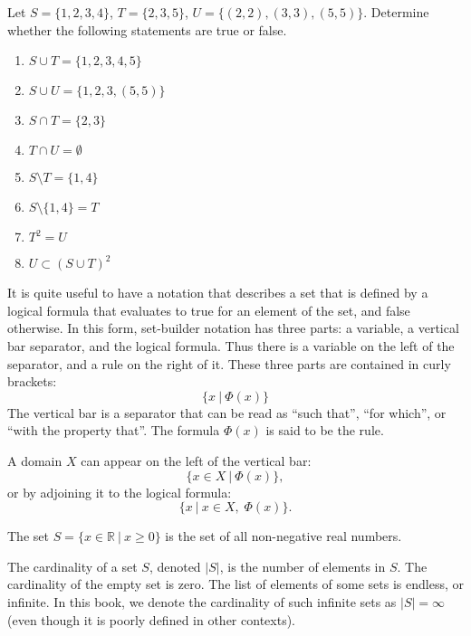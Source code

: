 \begin{exercise}
    Let $S = \{1, 2, 3, 4\}$, $T = \{2, 3, 5\}$, $U = \{(2, 2), (3, 3), (5, 5)\}$. Determine whether the following statements are true or false.
    \begin{multicols}{2}
        \begin{enumerate}[label=(\alph*)]
            \item $S \cup T = \{1, 2, 3, 4, 5\}$
            \item $S \cup U = \{1, 2, 3, (5, 5)\}$
            \item $S \cap T = \{2, 3\}$
            \item $T \cap U = \emptyset$
            \item $S \setminus T = \{1, 4\}$
            \item $S \setminus \{1, 4\} = T$
            \item $T^2 = U$
            \item $U \subset (S \cup T)^2$
        \end{enumerate}
    \end{multicols}
\end{exercise}
It is quite useful to have a notation that describes a set that is defined by a logical formula that evaluates to true for an element of the set, and false otherwise. In this form, set-builder notation has three parts: a variable, a vertical bar separator, and the logical formula. Thus there is a variable on the left of the separator, and a rule on the right of it. These three parts are contained in curly brackets:
\[
    \{x \ | \ \Phi(x)\}
\]
The vertical bar is a separator that can be read as ``such that'', ``for which'', or ``with the property that''. The formula $\Phi(x)$ is said to be the rule.

A domain $X$ can appear on the left of the vertical bar:
\[
    \{x \in X \ | \ \Phi(x)\},
\]
or by adjoining it to the logical formula:
\[
    \{x \ | \ x \in X,\; \Phi(x)\}.
\]
\begin{example}
    The set $S = \{x \in \mathbb{R} \ | \ x \geq 0 \}$ is the set of all non-negative real numbers.
\end{example}

The cardinality of a set $S$, denoted $|S|$, is the number of elements in $S$. The cardinality of the empty set is zero. The list of elements of some sets is endless, or infinite. In this book, we denote the cardinality of such infinite sets as $|S| = \infty$ (even though it is poorly defined in other contexts).

